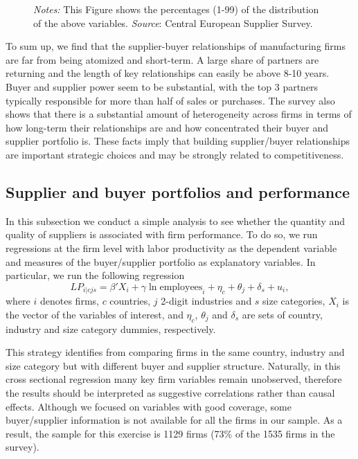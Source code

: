 \documentclass[final, dvipsnames, authoryear,12pt]{elsarticle}
\begin{document}
\begin{figure}[!h]
\begin{center}
    \end{center}    
        {\footnotesize \textit{Notes:} This Figure shows the percentages (1-99) of the distribution of the above variables. \textit{Source}: Central European Supplier Survey.} 
\end{figure}
\restoregeometry

To sum up, we find that the supplier-buyer relationships of manufacturing firms are far from being atomized and short-term. A large share of partners are returning and the length of key relationships can easily be above 8-10 years. Buyer and supplier power seem to be substantial, with the top 3 partners typically responsible for more than half of sales or purchases. The survey also shows that there is a substantial amount of heterogeneity across firms in terms of how long-term their relationships are and how concentrated their buyer and supplier portfolio is. These facts imply that building supplier/buyer relationships are important strategic choices and may be strongly related to competitiveness.


\subsection{Supplier and buyer portfolios and performance}

In this subsection we conduct a simple analysis to see whether the quantity and quality of suppliers is associated with firm performance. To do so, we run regressions at the firm level with labor productivity as the dependent variable and measures of the buyer/supplier portfolio as explanatory variables. In particular, we run the following regression
%
\begin{equation}
    LP_{i|cjs}=\beta' X_{i}+\gamma \ln \text{employees}_i+\eta_c+\theta_j+\delta_s+u_i,
\end{equation}{}
%
where $i$ denotes firms, $c$ countries, $j$ 2-digit industries and $s$ size categories, $X_{i}$ is the vector of the variables of interest, and $\eta_c$, $\theta_j$ and $\delta_s$ are sets of country, industry and size category dummies, respectively. 

This strategy identifies from comparing firms in the same country, industry and size category but with different buyer and supplier structure. Naturally, in this cross sectional regression many key firm variables remain unobserved, therefore the results should be interpreted as suggestive correlations rather than causal effects. Although we focused on variables with good coverage, some buyer/supplier information is not available for all the firms in our sample. As a result, the sample for this exercise is 1129 firms (73\% of the 1535 firms in the survey). 
\end{document}

